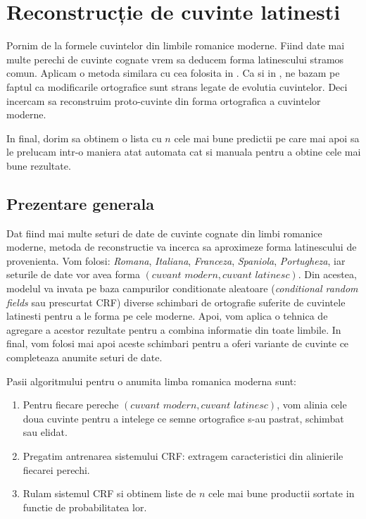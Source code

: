 \chapter{Reconstrucție de cuvinte latinesti}
Pornim de la formele cuvintelor din limbile romanice moderne. Fiind date mai multe perechi de cuvinte
cognate vrem sa deducem forma latinescului stramos comun. Aplicam o metoda similara cu cea folosita
in \cite{theone}. Ca si in \cite{theone}, ne bazam pe faptul ca modificarile ortografice sunt strans
legate de evolutia cuvintelor. Deci incercam sa reconstruim proto-cuvinte din forma ortografica a
cuvintelor moderne.

In final, dorim sa obtinem o lista cu $n$ cele mai bune predictii pe care mai apoi sa le prelucam
intr-o maniera atat automata cat si manuala pentru a obtine cele mai bune rezultate.

\section{Prezentare generala}
Dat fiind mai multe seturi de date de cuvinte cognate din limbi romanice moderne, metoda de 
reconstructie va incerca sa aproximeze forma latinescului de provenienta. Vom folosi: \textit{Romana},
\textit{Italiana}, \textit{Franceza}, \textit{Spaniola}, \textit{Portugheza}, iar seturile de date
vor avea forma $(\textit{cuvant modern}, \textit{cuvant latinesc})$. Din acestea, modelul va invata 
pe baza campurilor conditionate aleatoare (\textit{conditional random fields} sau prescurtat CRF) 
diverse schimbari de ortografie suferite de cuvintele latinesti pentru a le forma pe cele moderne. 
Apoi, vom aplica o tehnica de agregare a acestor rezultate pentru a combina informatie din toate 
limbile. In final, vom folosi mai apoi aceste schimbari pentru a oferi variante de cuvinte ce 
completeaza anumite seturi de date.

Pasii algoritmului pentru o anumita limba romanica moderna sunt:

\begin{enumerate}
  \item Pentru fiecare pereche $(\textit{cuvant modern}, \textit{cuvant latinesc})$, vom alinia
    cele doua cuvinte pentru a intelege ce semne ortografice s-au pastrat, schimbat sau elidat.
  \item Pregatim antrenarea sistemului CRF: extragem caracteristici din alinierile fiecarei perechi.
  \item Rulam sistemul CRF si obtinem liste de $n$ cele mai bune productii sortate in functie de
    probabilitatea lor.
\end{enumerate}

